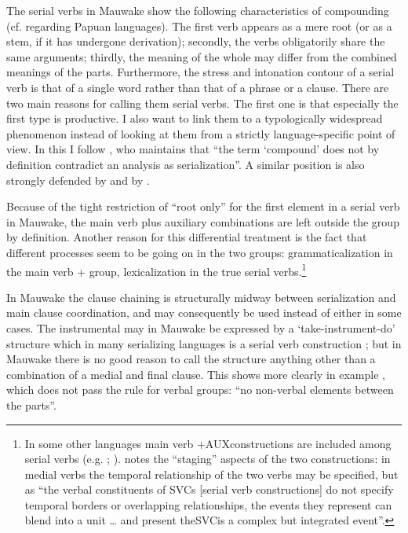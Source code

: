 The serial verbs in Mauwake show the following characteristics of compounding (cf. \citealt[69]{James1983} regarding Papuan languages). The first verb appears as a mere root (or as a stem, if it has undergone derivation); secondly, the verbs obligatorily share the same arguments; thirdly, the meaning of the whole may differ from the combined meanings of the parts. Furthermore, the stress and intonation contour of a serial verb is that of a single word rather than that of a phrase or a clause. There are two main reasons for calling them serial verbs. The first one is that especially the first type is productive. I also want to link them to a typologically widespread phenomenon instead of looking at them from a strictly language-specific point of view. In this I follow \citet[101]{Margetts1999}, who maintains that ``{the term `compound' does not by definition contradict an analysis as serialization}''. A similar position is also strongly defended by \citet[16]{Crowley2002} and by \citet[17]{Givon1991}.

Because of the tight restriction of ``root only'' for the first element in a serial verb in Mauwake, the main verb plus auxiliary combinations are left outside the group by definition. Another reason for this differential treatment is the fact that different processes seem to be going on in the two groups: grammaticalization in the main verb +  group, lexicalization in the true serial verbs.\footnote{In some other languages main verb +\textsc{AUX}constructions are included among serial verbs (e.g. \citealt[29]{James1983}; \citealt[178]{Crowley2002}). \citet[174]{Farr1999} notes the ``staging'' aspects of the two constructions: in medial verbs the temporal relationship of the two verbs may be specified, but as ``the verbal constituents of SVCs [serial verb constructions] do not specify temporal borders or overlapping relationships, the events they represent can blend into a unit {\dots} and present the\textsc{SVC}is a complex but integrated event''.} 

In Mauwake the clause chaining is structurally midway between serialization and main clause coordination, and may consequently be used instead of either in some cases. The instrumental may in Mauwake be expressed by a `take-instrument-do' structure  which in many serializing languages is a serial verb construction \citep[162--74]{Sebba1987}; but in Mauwake there is no good reason to call the structure anything other than a combination of a medial and final clause. This shows more clearly in example , which does not pass the rule for verbal groups: ``no non-verbal elements between the parts''. 


